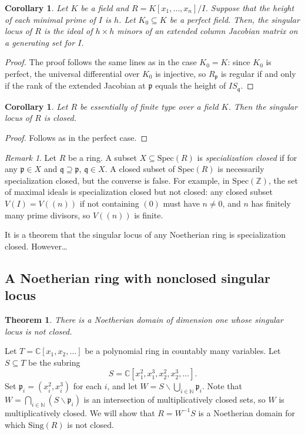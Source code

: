 \documentclass{amsart}[12pt]
\newcommand{\Spec}{\mathrm{Spec}}
\newcommand{\C}{\mathbb{C}}
\newcommand{\Z}{\mathbb{Z}}
\newcommand{\N}{\mathbb{N}}
\newcommand{\fp}{{\mathfrak p}}
\newcommand{\fq}{{\mathfrak q}}
\numberwithin{equation}{section}
\theoremstyle{plain} %
\newtheorem{thm}[equation]{Theorem}
\newtheorem{cor}[equation]{Corollary}
\theoremstyle{definition}
\theoremstyle{remark}
\newtheorem{rem}[equation]{Remark}
\begin{document}
\begin{cor} Let $K$ be a field and $R=K[x_1,\dots,x_n]/I$. Suppose that the height of each minimal prime of $I$ is $h$. Let $K_0\subseteq K$ be a perfect field. Then, the singular locus of $R$ is the ideal of $h\times h$ minors of an extended column Jacobian matrix on a generating set for $I$.
\end{cor}
\begin{proof} The proof follows the same lines as in the case $K_0=K$: since $K_0$ is perfect, the universal differential over $K_0$ is injective, so $R_{\fp}$ is regular if and only if the rank of the extended Jacobian at $\fp$ equals the height of $IS_{\fq}$.
\end{proof}

\begin{cor} Let $R$ be essentially of finite type over a field $K$. Then the singular locus of $R$ is closed.
\end{cor}
\begin{proof}
Follows as in the perfect case.
\end{proof}

\begin{rem} Let $R$ be a ring. A subset  $X\subseteq \Spec(R)$ is \emph{specialization closed} if for any $\fp\in X$ and $\fq \supseteq \fp$, $\fq\in X$. A closed subset of $\Spec(R)$ is necessarily specialization closed, but the converse is false. For example, in $\Spec(\Z)$, the set of maximal ideals is specialization closed but not closed: any closed subset $V(I) = V((n))$ if not containing $(0)$ must have $n\neq 0$, and $n$ has finitely many prime divisors, so $V((n))$ is finite.

It is a theorem that the singular locus of any Noetherian ring is specialization closed. However\dots
\end{rem}

\subsection{A Noetherian ring with nonclosed singular locus}

\begin{thm} There is a Noetherian domain of dimension one whose singular locus is not closed.
\end{thm}

 Let $T=\C[x_1,x_2,\dots]$ be a polynomial ring in countably many variables. Let $S\subseteq T$ be the subring
\[ S = \C[x_1^2,x_1^3,x_2^2,x_2^3,\dots].\]
Set $\fp_i=(x_i^2,x_i^3)$ for each $i$, and let $W= S \smallsetminus \bigcup_{i\in \N} \fp_i$.
Note that $W = \bigcap_{i\in \N} (S\smallsetminus \fp_i)$ is an intersection of multiplicatively closed sets, so $W$ is multiplicatively closed. We will show that $R=W^{-1}S$ is a Noetherian domain for which $\mathrm{Sing}(R)$ is not closed.
\end{document}
